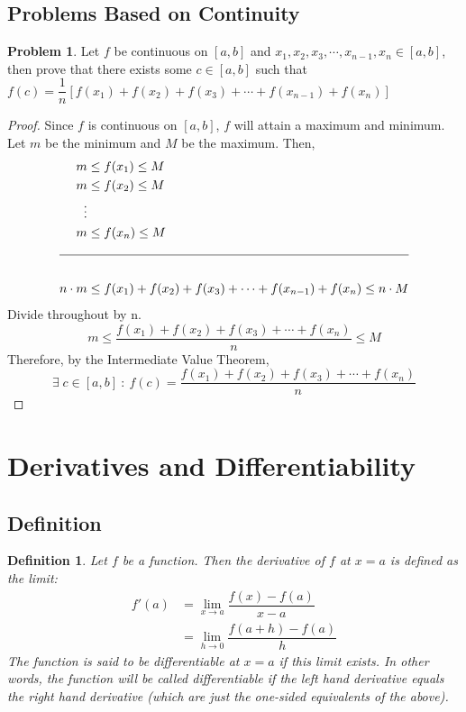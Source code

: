 \documentclass[14]{article}
\newtheorem{define}{Definition}
\theoremstyle{definition}
\newtheorem{prob}{Problem}
\theoremstyle{case}
\begin{document}
\subsection{Problems Based on Continuity}
\begin{prob}
Let $f$ be continuous on $[a, b]$ and $x_1, x_2, x_3, \cdots, x_{n-1}, x_n \in [a, b]$, then prove that there exists some $c \in [a, b]$ such that $f(c) = \dfrac{1}{n} \left[f(x_1) + f(x_2) + f(x_3) + \cdots + f(x_{n-1}) + f(x_n)\right]$\\
\begin{proof}
Since $f$ is continuous on $[a, b]$, $f$ will attain a maximum and minimum. Let $m$ be the minimum and $M$ be the maximum.
Then,
\begin{align*}
m &\le f(x_1) \le M\\
m &\le f(x_2) \le M\\
\vdots\\
m &\le f(x_n) \le M\\
\cline{1-2}\\
n\cdot m &\le f(x_1) + f(x_2) + f(x_3) + \cdots + f(x_{n-1}) + f(x_n) \le n\cdot M
\end{align*}
Divide throughout by n.\\
\[
m \leq \dfrac{f(x_1) + f(x_2) + f(x_3) + \cdots + f(x_n)}{n} \leq M
\]
Therefore, by the Intermediate Value Theorem,\\
\[
\exists\; c \in [a, b] \: : \: f(c) = \dfrac{f(x_1) + f(x_2) + f(x_3) + \cdots + f(x_n)}{n}
\]
\end{proof}
\end{prob}
\pagebreak
\section{Derivatives and Differentiability}
\subsection{Definition}
\begin{define}
Let $f$ be a function. Then the derivative of $f$ at $x = a$ is defined as the limit:
\begin{align*}
f'(a) &= \lim\limits_{x \to a} \dfrac{f(x) - f(a)}{x-a}\\
&= \lim\limits_{h \to 0} \dfrac{f(a + h) - f(a)}{h}
\end{align*}
The function is said to be differentiable at $x=a$ if this limit exists. In other words, the function will be called differentiable if the left hand derivative equals the right hand derivative (which are just the one-sided equivalents of the above).
\end{define}
\end{document}
